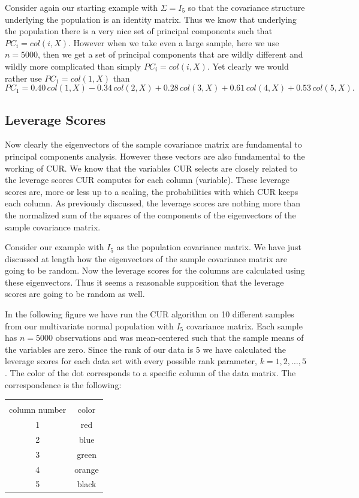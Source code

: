 \documentclass{book}
\begin{document}
Consider again our starting example with $\Sigma=I_5$ so that the covariance structure underlying the population is an identity matrix. Thus we know that underlying the population there is a very nice set of principal components such that $PC_i=col(i,X)$. However when we take even a large sample, here we use $n=5000$, then we get a set of principal components that are wildly different and wildly more complicated than simply $PC_i=col(i,X)$. Yet clearly we would rather use $PC_1=col(1,X)$ than
$$
PC_1=0.40\,col(1,X)-0.34\,col(2,X)+0.28\,col(3,X)+0.61\,col(4,X)+0.53\,col(5,X).
$$

\subsection{Leverage Scores}

Now clearly the eigenvectors of the sample covariance matrix are fundamental to principal components analysis. However these vectors are also fundamental to the working of CUR. We know that the variables CUR selects are closely related to the leverage scores CUR computes for each column (variable). These leverage scores are, more or less up to a scaling, the probabilities with which CUR keeps each column. As previously discussed, the leverage scores are nothing more than the normalized sum of the squares of the components of the eigenvectors of the sample covariance matrix. 

Consider our example with $I_5$ as the population covariance matrix. We have just discussed at length how the eigenvectors of the sample covariance matrix are going to be random. Now the leverage scores for the columns are calculated using these eigenvectors. Thus it seems a reasonable supposition that the leverage scores are going to be random as well. 

In the following figure we have run the CUR algorithm on 10 different samples from our multivariate normal population with $I_5$ covariance matrix. Each sample has $n=5000$ observations and was mean-centered such that the sample means of the variables are zero. Since the rank of our data is 5 we have calculated the leverage scores for each data set with every possible rank parameter, $k=1,2,\ldots,5$. The color of the dot corresponds to a specific column of the data matrix. The correspondence is the following:

\begin{center}
\begin{tabular}{|c|c|}
 \hline& \\
column number& color\\\hline
1& red\\
2& blue\\
3& green\\
4& orange\\
5& black\\
\hline
\end{tabular} 
\end{center}
\end{document}
